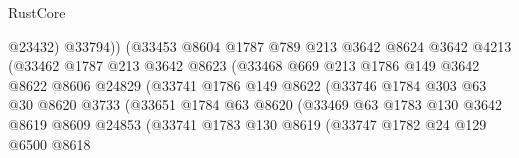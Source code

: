 \begin{lexlean}{RustCore}
\begin{coremodule}
                                    @23432)
                                  @33794))
                              (@33453
                                @8604
                                @1787
                                @789
                                @213
                                @3642
                                @8624
                                @3642
                                @4213
                                (@33462
                                  @1787
                                  @213
                                  @3642
                                  @8623
                                  (@33468
                                    @669
                                    @213
                                    @1786
                                    @149
                                    @3642
                                    @8622
                                    @8606
                                    @24829
                                    (@33741
                                      @1786
                                      @149
                                      @8622
                                      (@33746
                                        @1784
                                        @303
                                        @63
                                        @30
                                        @8620
                                        @3733
                                        (@33651
                                          @1784
                                          @63
                                          @8620
                                          (@33469
                                            @63
                                            @1783
                                            @130
                                            @3642
                                            @8619
                                            @8609
                                            @24853
                                            (@33741
                                              @1783
                                              @130
                                              @8619
                                              (@33747
                                                @1782
                                                @24
                                                @129
                                                @6500
                                                @8618

\end{coremodule}
\end{lexlean}
